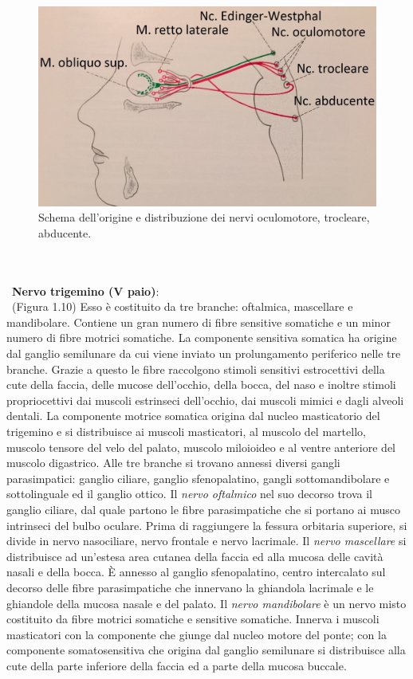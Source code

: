 \\\ \\\
\begin{figure}[h!]
	\centering
	\includegraphics[scale=0.15]{source/immagini/nervo_abducente.jpg}
	\caption[Origine III, IV, VI nervo cranico]{Schema dell'origine e distribuzione dei nervi oculomotore, trocleare, abducente.}
	\label{fig:test10}
\end{figure}
\\\ \\\ 
\textbf{Nervo trigemino (V paio)}: 
\\\ 
(Figura 1.10) Esso è costituito da tre branche: oftalmica, mascellare e mandibolare. Contiene un gran numero di fibre sensitive somatiche e un minor numero di fibre motrici somatiche. La componente sensitiva somatica ha origine dal ganglio semilunare da cui viene inviato un prolungamento periferico nelle tre branche. Grazie a questo le fibre raccolgono stimoli sensitivi estrocettivi della cute della faccia, delle mucose dell’occhio, della bocca, del naso e inoltre stimoli propriocettivi dai muscoli estrinseci dell’occhio, dai muscoli mimici e dagli alveoli dentali. La componente motrice somatica origina dal nucleo masticatorio del trigemino e si distribuisce ai muscoli masticatori, al muscolo del martello, muscolo tensore del velo del palato, muscolo miloioideo e al ventre anteriore del muscolo digastrico. 
Alle tre branche si trovano annessi diversi gangli parasimpatici: ganglio ciliare, ganglio sfenopalatino, gangli sottomandibolare e sottolinguale ed il ganglio ottico. 
Il \emph{nervo oftalmico} nel suo decorso trova il ganglio ciliare, dal quale partono le fibre parasimpatiche che si portano ai musco intrinseci del bulbo oculare. Prima di raggiungere la fessura orbitaria superiore, si divide in nervo nasociliare, nervo frontale e nervo lacrimale.
Il \emph{nervo mascellare} si distribuisce ad un’estesa area cutanea della faccia ed alla mucosa delle cavità nasali e della bocca. È annesso al ganglio sfenopalatino, centro intercalato sul decorso delle fibre parasimpatiche che innervano la ghiandola lacrimale e le ghiandole della mucosa nasale e del palato.
Il \emph{nervo mandibolare} è un nervo misto costituito da fibre motrici somatiche e sensitive somatiche. Innerva i muscoli masticatori con la componente che giunge dal nucleo motore del ponte; con la componente somatosensitiva che origina dal ganglio semilunare si distribuisce alla cute della parte inferiore della faccia ed a parte della mucosa buccale. 

